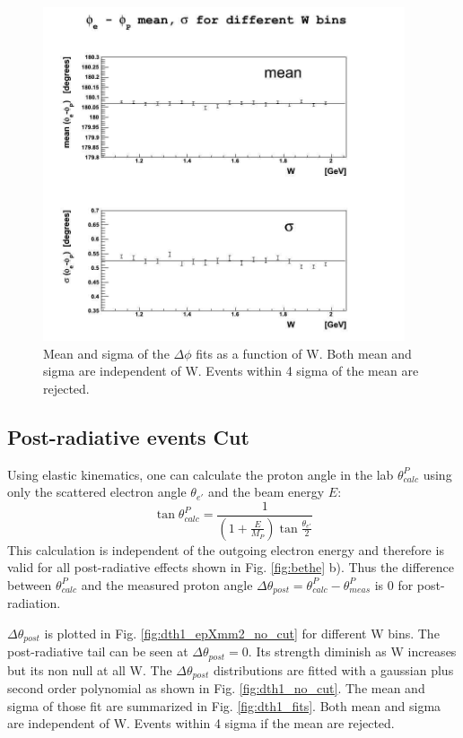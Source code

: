 \begin{figure}[ht]
	\centering
	\includegraphics[width=0.95\textwidth]{img/dphi_fits.jpg}
	\caption{Mean and sigma of the $\Delta\phi$ fits as a function of W. Both mean and sigma
	are independent of W. Events within 4 sigma of the mean are rejected. }
		\label{fig:dphi_fits}
\end{figure}
\clearpage\newpage

\subsection{Post-radiative events Cut}
Using elastic kinematics, one can calculate the proton angle in the lab $\theta^P_{calc}$
using only the scattered electron angle $\theta_{e'}$ and the beam energy $E$:
$$
\tan\theta^P_{calc} =  \frac{1}{(1+\frac{E}{M_P})\tan\frac{\theta_{e'}}{2}}
$$
This calculation is independent of the outgoing electron energy and therefore is valid for
all post-radiative effects shown in Fig. \ref{fig:bethe} b).
Thus the difference between $\theta^P_{calc}$ and the measured proton angle
$\Delta\theta_{post} = \theta^P_{calc} - \theta^P_{meas} $ is 0 for post-radiation.


$\Delta\theta_{post}$ is plotted in Fig. \ref{fig:dth1_epXmm2_no_cut}
for different W bins. The post-radiative tail can be seen at $\Delta\theta_{post}=0$.
Its strength diminish as W increases but its non null at all W.
The $\Delta\theta_{post}$ distributions are fitted with a gaussian plus second order polynomial
as shown in Fig. \ref{fig:dth1_no_cut}. The mean and sigma of those fit are summarized in Fig. \ref{fig:dth1_fits}.
Both mean and sigma are independent of W. Events within 4 sigma if the mean are rejected.

